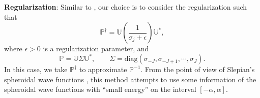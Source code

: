 \documentclass[final]{siamltex}
\begin{document}
\textbf{Regularization}: Similar to \cite{DLMZ2021}, our choice is to consider the regularization such that
\begin{equation} \label{data completion Tikhonov 1}
\mathbb{P}^\dagger = \mathbb{U} \left(\frac{1}{ \sigma_j + \epsilon}\right) \mathbb{U}^*,
\end{equation}
where $\epsilon>0$ is a regularization parameter, and
$$
\mathbb{P} = \mathbb{U} \Sigma \mathbb{U}^*, \qquad \Sigma=\mbox{diag}(\sigma_{-J},\sigma_{-J+1}, \cdots, \sigma_{J}).
$$
In this case, we take $\mathbb{P}^\dagger$ to approximate $\mathbb{P}^{-1}$. From the point of view of Slepian's spheroidal wave functions \cite{Slepian78,Varah1993}, this method attempts to use some information of the spheroidal wave functions with ``small energy'' on the interval $[-\alpha,\alpha]$.
%
%
\end{document}
